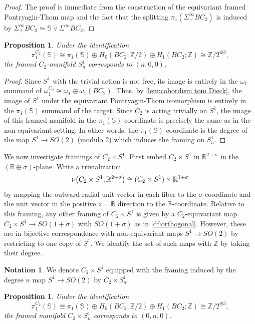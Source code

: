 \documentclass[11pt]{amsart}
\newcommand{\R}{\mathbb R}
\newcommand{\Z}{\mathbb{Z}}
\newcommand{\Sph}{\mathbb{S}}
\theoremstyle{plain}   %
\newtheorem{prop}[thm]{Proposition}
\theoremstyle{definition}
\newtheorem{notn}[thm]{Notation}
\theoremstyle{remark}
\numberwithin{equation}{section}
\let\originalleft\left
\let\originalright\right
\renewcommand{\left}{\mathopen{}\mathclose\bgroup\originalleft}
\renewcommand{\right}{\aftergroup\egroup\originalright}
\begin{document}
\begin{proof}
The proof is immediate from the construction of the equivariant framed Pontryagin-Thom map and the fact that the splitting $\pi_1(\Sigma_+^\infty BC_2)$ is induced by $\Sigma_+^\infty BC_2\simeq \Sph\vee \Sigma^\infty BC_2$. 
\end{proof}


\begin{prop}
Under the identification
\[
\pi_1^{C_2}(\Sph) \cong \pi_1(\Sph)\oplus H_0(BC_2;\Z/2)\oplus H_1(BC_2;\Z)\cong\Z/2^{\oplus 3},
\]
the framed $C_2$-manifold $S^1_n$ corresponds to $(n,0,0)$.
\end{prop}

\begin{proof}
Since $S^1$ with the trivial action is not free, its image is entirely in the $\omega_1$ summand of $\omega_1^{C_2}\cong \omega_1\oplus \omega_1(BC_2)$. Thus, by \cref{lem:cobordism tom Dieck}, the image of $S^1$ under the equivariant Pontryagin-Thom isomorphism is entirely in the $\pi_1(\Sph)$ summand of the target. Since $C_2$ is acting trivially on $S^1$, the image of this framed manifold in the $\pi_1(\Sph)$ coordinate is precisely the same as in the non-equivariant setting. In other words, the $\pi_1(\Sph)$ coordinate is the degree of the map $S^1\to SO(2)$ (modulo 2) which induces the framing on $S^1_n$. 
\end{proof}

We now investigate framings of $C_2\times S^1$. First embed $C_2\times S^1$ in $\R^{2+\sigma}$ in the $(\R\oplus\sigma)$-plane. Write a trivialization 
\[
\nu\left(C_2\times S^1,\R^{2+\sigma}\right)\cong (C_2\times S^1)\times \R^{1+\sigma}
\]
by mapping the outward radial unit vector in each fiber to the $\sigma$-coordinate and the unit vector in the positive $z=\R$ direction to the $\R$-coordinate. Relative to this framing, any other framing of $C_2\times S^1$ is given by a $C_2$-equivariant map $C_2\times S^1\to SO(1+\sigma)$ with $SO(1+\sigma)$ as in \cref{df:orthogonal}. However, these are in bijective correspondence with non-equivariant maps $S^1\to SO(2)$ by restricting to one copy of $S^1$. We identify the set of such maps with $\Z$ by taking their degree. 

\begin{notn}
We denote $C_2\times S^1$ equipped with the framing induced by the degree $n$ map $S^1\to SO(2)$ by $C_2\times S^1_n$. 
\end{notn}

\begin{prop}\label{prop:swap}
Under the identification
\[
\pi_1^{C_2}(\Sph) \cong \pi_1(\Sph)\oplus H_0(BC_2;\Z/2)\oplus H_1(BC_2;\Z)\cong\Z/2^{\oplus 3},
\]
the framed manifold $C_2\times S^1_n$ corresponds to $(0,n,0)$.
\end{prop}
\end{document}
